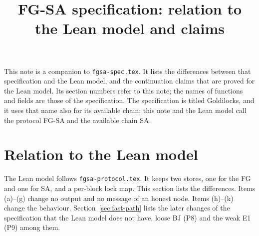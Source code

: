 \documentclass{article}
\title{FG-SA specification: relation to the Lean model and claims}
\author{}
\date{}
\begin{document}
\maketitle

This note is a companion to \texttt{fgsa-spec.tex}.  It lists the
differences between that specification and the Lean model, and the
continuation claims that are proved for the Lean model.  Its section
numbers refer to this note; the names of functions and fields are those
of the specification.  The specification is titled Goldilocks, and it uses that name
also for its available chain; this note and the Lean model call the
protocol FG-SA and the available chain SA.

\section{Relation to the Lean model}\label{sec:lean}

The Lean model follows \texttt{fgsa-protocol.tex}.  It keeps two stores,
one for the FG and one for SA, and a per-block lock map.  This section
lists the differences.  Items (a)--(g) change no output and no message
of an honest node.  Items (h)--(k) change the behaviour.
Section~\ref{sec:fast-path} lists the later changes of the specification
that the Lean model does not have, loose BJ (P8) and the weak E1 (P9)
among them.
\end{document}
